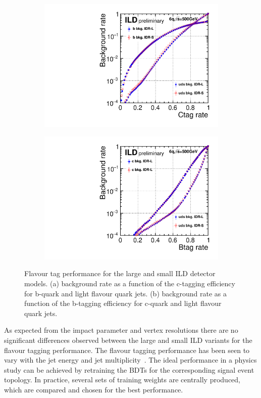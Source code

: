\begin{figure}[htbp]
\begin{subfigure}{0.49\hsize}
\includegraphics[width=\textwidth]{Performance/fig/ctag_performance.pdf}
 \caption{ \label{fig:HLR-ctag_perf}}
 \end{subfigure}
\begin{subfigure}{0.49\hsize}
\includegraphics[width=\textwidth]{Performance/fig/btag_performance.pdf}
 \caption{  \label{fig:HLR-btag_perf}}
 \end{subfigure}
\caption{Flavour tag performance for the large and small ILD detector models. (a) background rate as a function of the c-tagging efficiency
  for b-quark and light flavour quark jets. (b) background rate as a function of the b-tagging efficiency for c-quark and light flavour quark jets. }
\label{fig:HLR-flavtag}
\end{figure}
%
As expected from the impact parameter and vertex resolutions there are no significant differences observed between the large and small ILD variants
for the flavour tagging performance.
The flavour tagging performance has been seen to vary with the jet energy and jet multiplicity~\cite{Suehara:2015ura}.
The ideal performance in a physics study can be achieved by retraining the BDTs for the corresponding signal event topology.
In practice, several sets of training weights are centrally produced, which are compared and chosen for the best performance.

